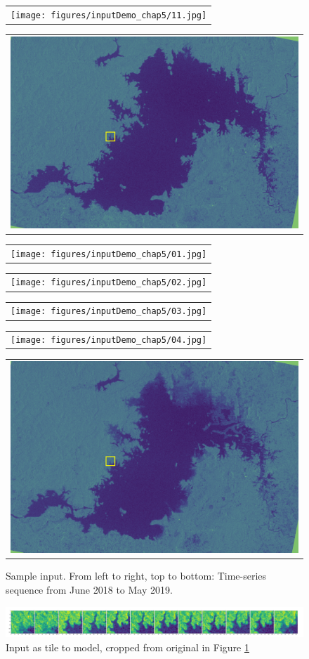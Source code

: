 \begin{figure}[h!]
\begin{center}
\begin{tabular}[b]{c}
            \texttt{[image: figures/inputDemo\_chap5/11.jpg]}
		\end{tabular}
        \begin{tabular}[b]{c}
            \includegraphics[width=0.3\linewidth]{figures/inputDemo_chap5/12.jpg}
        \end{tabular}
        \begin{tabular}[b]{c}
            \texttt{[image: figures/inputDemo\_chap5/01.jpg]}
        \end{tabular}
        \begin{tabular}[b]{c}
            \texttt{[image: figures/inputDemo\_chap5/02.jpg]}
		\end{tabular}
        \begin{tabular}[b]{c}
            \texttt{[image: figures/inputDemo\_chap5/03.jpg]}
        \end{tabular}
        \begin{tabular}[b]{c}
            \texttt{[image: figures/inputDemo\_chap5/04.jpg]}
        \end{tabular}
        \begin{tabular}[b]{c}
            \includegraphics[width=0.3\linewidth]{figures/inputDemo_chap5/05.jpg}
		\end{tabular} 
    \end{center}
	\caption[]{Sample input. From left to right, top to bottom: Time-series sequence from June 2018 to May 2019.}
	\label{fig:inputTs}
\end{figure}

\begin{figure}[h!]
	\centering
	\includegraphics[width=1\textwidth]{figures/tileInput.png}
	\caption[]{Input as tile to model, cropped from original in Figure \ref{fig:inputTs}}
	\label{fig:tileInputTs}
\end{figure}

